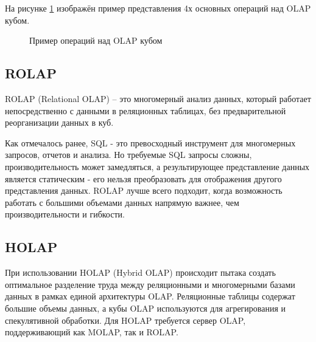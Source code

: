 На рисунке \ref{fig:cubes-operations} изображён пример представления 4х основных операций над OLAP кубом.

\begin{figure}[!h]
	\caption{Пример операций над OLAP кубом}
	\label{fig:cubes-operations}
\end{figure}

\subsection*{ROLAP}

ROLAP (Relational OLAP) \cite{olap} -- это многомерный анализ данных, который работает непосредственно 
с данными в реляционных таблицах, без предварительной реорганизации данных в куб.

Как отмечалось ранее, SQL - это превосходный инструмент для многомерных запросов, отчетов и анализа. Но требуемые SQL запросы сложны, производительность может замедляться, а результирующее представление данных является статическим - его нельзя преобразовать для отображения другого представления данных. ROLAP лучше всего подходит, когда возможность работать с большими объемами данных напрямую важнее, чем производительности и гибкости.


\subsection*{HOLAP}

При использовании HOLAP (Hybrid OLAP) \cite{olap} происходит пытака создать оптимальное разделение труда между 
реляционными и многомерными базами данных в рамках единой архитектуры OLAP.
Реляционные таблицы содержат большие объемы данных, а кубы OLAP используются для агрегирования и спекулятивной обработки. 
Для HOLAP требуется сервер OLAP, поддерживающий как MOLAP, так и ROLAP.

